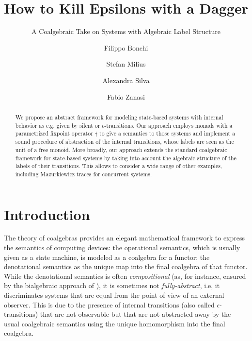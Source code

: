 \documentclass[oribibl,envcountsame,envcountsect,runningheads]{llncs}
\renewcommand{\>}{\rangle}
\begin{document}
\title{How to Kill Epsilons with a Dagger}
\subtitle{A Coalgebraic Take on Systems with Algebraic Label Structure}

\author{Filippo Bonchi \and Stefan Milius \and Alexandra Silva \and Fabio Zanasi }


\maketitle

\begin{abstract}
We propose an abstract framework for modeling state-based systems with internal behavior as e.g. given by silent or $\epsilon$-transitions. Our approach employs monads with a parametrized fixpoint operator $\dagger$ to give a semantics to those systems and implement a sound procedure of abstraction of the internal transitions, whose labels are seen as the unit of a free monoid. More broadly, our approach extends the standard coalgebraic framework for state-based systems by taking into account the algebraic structure of the labels of their transitions. This allows to consider a wide range of other examples, including Mazurkiewicz traces for concurrent systems.
\end{abstract}

\section{Introduction}\label{Sec:Intro}
The theory of coalgebras provides an elegant mathematical framework to express the semantics of computing devices:
the operational semantics, which is usually given as a state machine, is modeled as a coalgebra for a functor; the denotational semantics as the unique map into the final coalgebra of that functor. While  the denotational semantics is often \emph{compositional} (as, for instance, ensured by the bialgebraic approach of \cite{plotkin-semop}), it is sometimes not \emph{fully-abstract}, i.e, it discriminates systems that are equal from the point of view of an external observer. This is due to the presence of internal transitions (also called $\epsilon$-transitions) that are not observable but that are not abstracted away by the usual coalgebraic semantics using the unique homomorphism into the final coalgebra.
\end{document}
